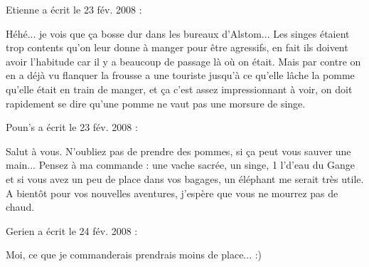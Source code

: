 \medskip
Etienne a écrit le 23 fév. 2008 :
\begin{displayquote}
Héhé... je vois que ça bosse dur dans les bureaux d'Alstom...
Les singes étaient trop contents qu'on leur donne à manger pour être agressifs, en fait ils doivent avoir l'habitude car il y a beaucoup de passage là où on était. Mais par contre on en a déjà vu flanquer la frousse a une touriste jusqu'à ce qu'elle lâche la pomme qu'elle était en train de manger, et ça c'est assez impressionnant à voir, on doit rapidement se dire qu'une pomme ne vaut pas une morsure de singe.
\end{displayquote}

\medskip
Poun's a écrit le 23 fév. 2008 :
\begin{displayquote}
Salut à vous. N'oubliez pas de prendre des pommes, si ça peut vous sauver une main...
Pensez à ma commande : une vache sacrée, un singe, 1 l'd'eau du Gange et si vous avez un peu de place dans vos bagages, un éléphant me serait très utile.
A bientôt pour vos nouvelles aventures, j'espère que vous ne mourrez pas de chaud.
\end{displayquote}

\medskip
Gerien a écrit le 24 fév. 2008 :
\begin{displayquote}
Moi, ce que je commanderais prendrais moins de place...
:)
\end{displayquote}

\vfill
